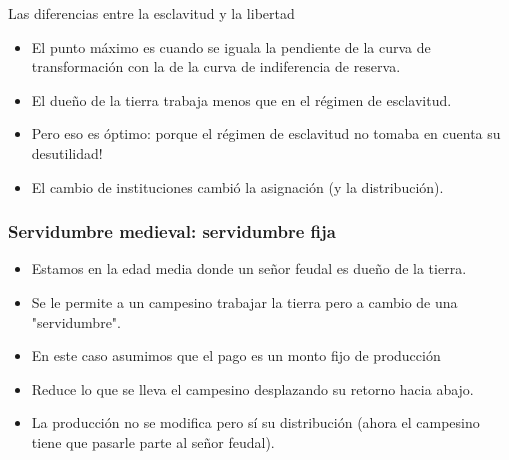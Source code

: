\documentclass{beamer}
\begin{document}
\begin{frame}{Las diferencias entre la esclavitud y la libertad}
    \begin{itemize}
        \begin{boxA}
            \centering
            En el óptimo, el trabajador elegirá el nivel de trabajo donde el costo marginal iguala a la producción marginal, que es el punto en el que se maximiza la diferencia entre estas dos curvas.
        \end{boxA}
        \item El punto máximo es cuando se iguala la pendiente de la curva de transformación con la de la curva de indiferencia de reserva. 
        \item El dueño de la tierra trabaja menos que en el régimen de esclavitud.
        \item Pero eso es óptimo: porque el régimen de esclavitud no tomaba en cuenta su desutilidad!
        \item El cambio de instituciones cambió la asignación (y la distribución).
    \end{itemize}
\end{frame}

\begin{frame}
\frametitle{Servidumbre medieval: servidumbre fija}
\begin{itemize}
    \item Estamos en la edad media donde un señor feudal es dueño de la tierra. 
    \item Se le permite a un campesino trabajar la tierra pero a cambio de una "servidumbre". 
    \item  En este caso asumimos que el pago es un monto fijo de producción 
    \item Reduce lo que se lleva el campesino desplazando su retorno hacia abajo.
    \item La producción no se modifica pero sí su distribución (ahora el campesino tiene que pasarle parte al señor feudal). 
\end{itemize}
\end{frame}
\end{document}

